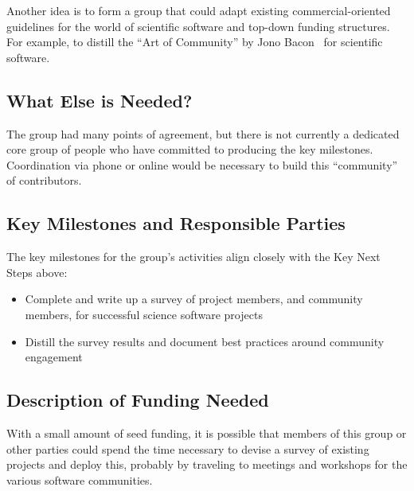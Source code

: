  Another idea is to form a group that could adapt existing commercial-oriented 
 guidelines for the world of scientific software and top-down funding structures.
 For example, to distill the ``Art of Community'' by Jono Bacon~\cite{art-of-community}
for scientific software.


\subsection{What Else is Needed?}

The group had many points of agreement, but there is not currently a dedicated core group
of people who have committed to producing the key milestones. Coordination via phone or
online would be necessary to build this ``community'' of contributors.

\subsection{Key Milestones and Responsible Parties}

The key milestones for the group's activities align closely with the Key Next Steps above:

\begin{itemize}
\item Complete and write up a survey of project members, and community members, for successful science software projects
\item Distill the survey results and document best practices around community engagement
\end{itemize}


\subsection{Description of Funding Needed}

With a small amount of seed funding, it is possible that members of this group or other parties could
spend the time necessary to devise a survey of existing projects and deploy this, probably by traveling to
meetings and workshops for the various software communities.
